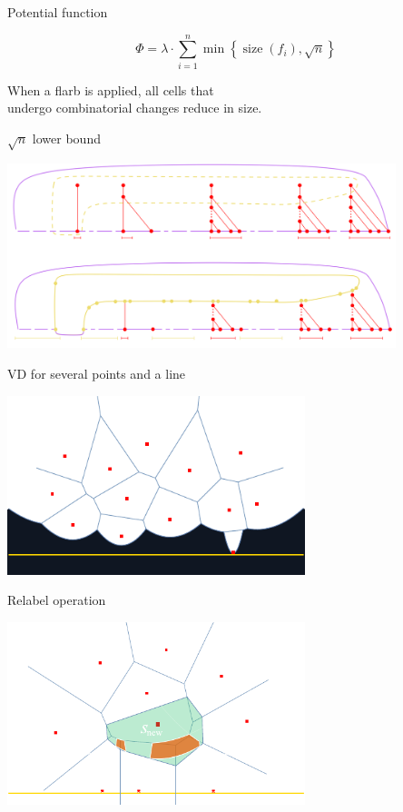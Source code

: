 \documentclass[17pt]{extarticle}
\newcommand{\newslide}[1]{\newpage \begin{center} \large #1 \end{center}}
\DeclareMathOperator{\size}{size}
\begin{document}
\newslide{Potential function}
\[ Φ = λ \cdot \sum\limits_{i=1}^n
   \min\left\{
      \size(f_i), \sqrt{n}
   \right\}\]

When a flarb is applied, all cells that \\
undergo combinatorial changes reduce in size.

\newslide{\(\sqrt{n}\) lower bound}

\begin{center}
	\includegraphics[width=0.85\textwidth]{figs/sqrtn}
\end{center}

\newslide{VD for several points and a line}

\begin{center}
	\includegraphics[width=0.65\textwidth]{figs/bl-ex-dark}
\end{center}

\newslide{Relabel operation}

\begin{center}
	\includegraphics[width=0.65\textwidth]{figs/combchange-dark}
\end{center}
\end{document}
